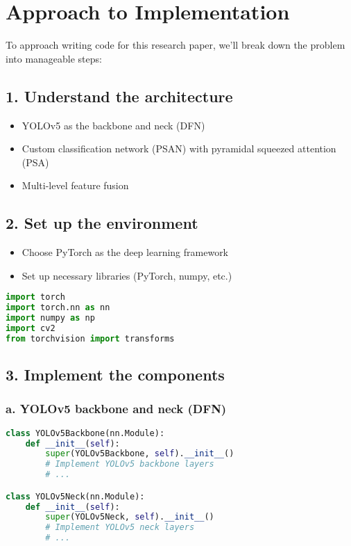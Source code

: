 \documentclass[12pt,a4paper]{article}
\begin{document}
\section{Approach to Implementation}

To approach writing code for this research paper, we'll break down the problem into manageable steps:

\subsection{1. Understand the architecture}
\begin{itemize}
    \item YOLOv5 as the backbone and neck (DFN)
    \item Custom classification network (PSAN) with pyramidal squeezed attention (PSA)
    \item Multi-level feature fusion
\end{itemize}

\subsection{2. Set up the environment}
\begin{itemize}
    \item Choose PyTorch as the deep learning framework
    \item Set up necessary libraries (PyTorch, numpy, etc.)
\end{itemize}

\begin{lstlisting}[language=Python, caption=Environment Setup]
import torch
import torch.nn as nn
import numpy as np
import cv2
from torchvision import transforms
\end{lstlisting}

\subsection{3. Implement the components}
\subsubsection{a. YOLOv5 backbone and neck (DFN)}
\begin{lstlisting}[language=Python, caption=YOLOv5 Backbone and Neck]
class YOLOv5Backbone(nn.Module):
    def __init__(self):
        super(YOLOv5Backbone, self).__init__()
        # Implement YOLOv5 backbone layers
        # ...

class YOLOv5Neck(nn.Module):
    def __init__(self):
        super(YOLOv5Neck, self).__init__()
        # Implement YOLOv5 neck layers
        # ...
\end{lstlisting}
\end{document}
